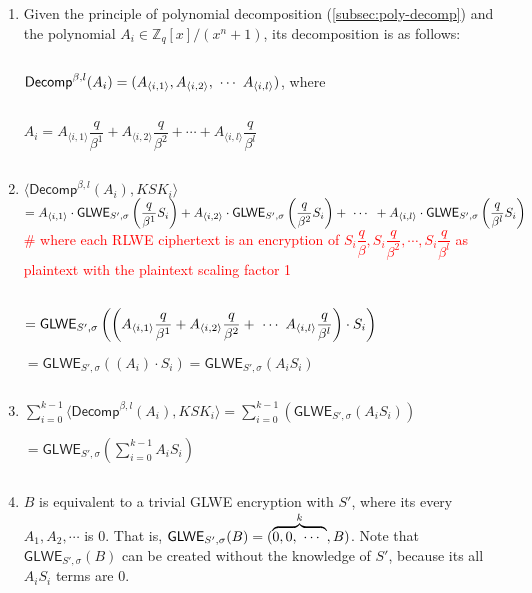 \begin{myproof}

\begin{enumerate}
\item Given the principle of polynomial decomposition (\autoref{subsec:poly-decomp}) and the polynomial $A_i \in \mathbb{Z}_q[x] / (x^n + 1)$, its decomposition is as follows: 

$ $

$\textsf{Decomp}^{\beta, l}(A_i) = (A_{\langle i,1 \rangle}, A_{\langle i,2 \rangle}, \text{ } \text{$\cdots$} \text{ } A_{\langle i,l \rangle})$, where

$ $

$A_i = A_{\langle i, 1 \rangle} \dfrac{q}{\beta^1} + A _{\langle i, 2 \rangle}\dfrac{q}{\beta^2} + \cdots + A_{\langle i, l \rangle} \dfrac{q}{\beta^l}  $

$ $

\item $\langle \textsf{Decomp}^{\beta, l}(A_i), \mathit{KSK}_i \rangle $ \\
$ =  A_{\langle i,1 \rangle} \cdot \textsf{GLWE}_{S', \sigma} \left ( 
 \dfrac{q}{\beta^1}S_i \right ) + A_{\langle i,2 \rangle} \cdot \textsf{GLWE}_{S', \sigma} \left ( 
 \dfrac{q}{\beta^2}S_i \right ) + \text{ } \text{$\cdots$} \text{ } + A_{\langle i,l \rangle} \cdot \textsf{GLWE}_{S', \sigma} \left ( 
 \dfrac{q}{\beta^l}S_i \right ) $ 
\textcolor{red}{ \# where each \textsf{RLWE} ciphertext is an encryption of $S_i\dfrac{q}{\beta}, S_i\dfrac{q}{\beta^2}, \cdots, S_i\dfrac{q}{\beta^l}$ as plaintext with the plaintext scaling factor 1}

$ $
 
$= \textsf{GLWE}_{S', \sigma} \left ( 
 \left ( A_{\langle i,1 \rangle} \dfrac{q}{\beta^1} + A_{\langle i,2 \rangle} \dfrac{q}{\beta^2} + \text{ } \text{$\cdots$} \text{ } A_{\langle i,l \rangle} \dfrac{q}{\beta^l} \right ) \cdot S_i \right )$ 

 
$= \textsf{GLWE}_{S', \sigma} \left ( 
 \left ( A_i \right ) \cdot S_i \right ) = \textsf{GLWE}_{S', \sigma} ( 
 A_i  S_i ) $ 

$ $
 
 \item $\sum \limits_{i=0}^{k-1} \langle \textsf{Decomp}^{\beta, l}(A_i), \mathit{KSK}_i \rangle = \sum \limits_{i=0}^{k-1} (\textsf{GLWE}_{S', \sigma} ( 
 A_i  S_i )) $ 
 
 $= \textsf{GLWE}_{S', \sigma} \left ( \sum \limits_{i=0}^{k-1}  
 A_i  S_i  \right ) $

$ $
 
 \item $B$ is equivalent to a trivial GLWE encryption with $S'$, where its every $A_1, A_2, \cdots$ is 0. That is, $\textsf{GLWE}_{S', \sigma}(B) = (\overbrace{0, 0, \text{ } \text{$\cdots$} \text{ }}^k, B)$. Note that $\textsf{GLWE}_{S', \sigma}(B)$ can be created without the knowledge of $S'$, because its all $A_iS_i$ terms are $0$. 


\end{enumerate}
\end{myproof}
